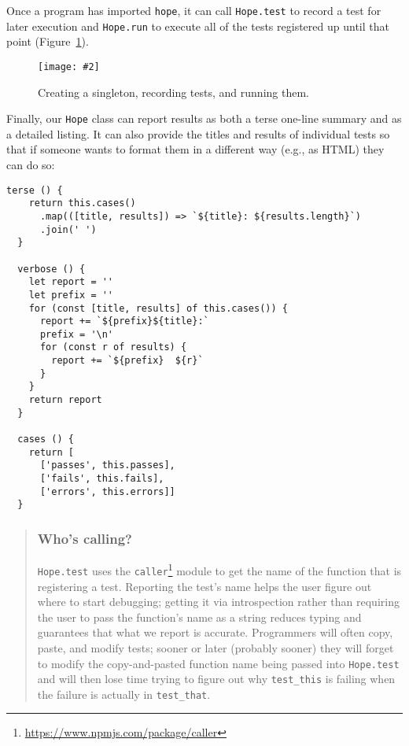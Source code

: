 \documentclass[krantzl]{krantz}
\newcommand{\figpdf}[4]{\begin{figure}%
\centering%
\texttt{[image: \#2]}%
\caption{#3}%
\label{#1}%
\end{figure}}
\newcommand{\figref}[1]{Figure~\ref{#1}}
\newenvironment{callout}{\savenotes\begin{tBox}\begin{quotation}\toggletrue{inbox}\renewcommand{\thempfootnote}{\arabic{footnote}}}{\end{quotation}\vspace{\baselineskip}\end{tBox}\togglefalse{inbox}\spewnotes}
\newcommand{\hreffoot}[2]{{#1}\footnote{\href{#2}{#2}}}
\begin{document}
Once a program has imported \texttt{hope},
it can call \texttt{Hope.test} to record a test for later execution
and \texttt{Hope.run} to execute all of the tests registered up until that point
(\figref{unit-test-hope-structure}).

\figpdf{unit-test-hope-structure}{./unit-test/hope-structure.pdf}{Creating a singleton, recording tests, and running them.}{0.6}


Finally,
our \texttt{Hope} class can report results as both a terse one-line summary and as a detailed listing.
It can also provide the titles and results of individual tests
so that if someone wants to format them in a different way (e.g., as HTML) they can do so:


\begin{lstlisting}[frame=single,frameround=tttt]
  terse () {
    return this.cases()
      .map(([title, results]) => `${title}: ${results.length}`)
      .join(' ')
  }

  verbose () {
    let report = ''
    let prefix = ''
    for (const [title, results] of this.cases()) {
      report += `${prefix}${title}:`
      prefix = '\n'
      for (const r of results) {
        report += `${prefix}  ${r}`
      }
    }
    return report
  }

  cases () {
    return [
      ['passes', this.passes],
      ['fails', this.fails],
      ['errors', this.errors]]
  }
\end{lstlisting}


\begin{callout}


\subsubsection*{Who's calling?}


\texttt{Hope.test} uses the \hreffoot{\texttt{caller}}{https://www.npmjs.com/package/caller} module
to get the name of the function that is registering a test.
Reporting the test's name helps the user figure out where to start debugging;
getting it via introspection
rather than requiring the user to pass the function's name as a string
reduces typing
and guarantees that what we report is accurate.
Programmers will often copy, paste, and modify tests;
sooner or later (probably sooner) they will forget to modify
the copy-and-pasted function name being passed into \texttt{Hope.test}
and will then lose time trying to figure out why \texttt{test\_this} is failing
when the failure is actually in \texttt{test\_that}.

\end{callout}
\end{document}
